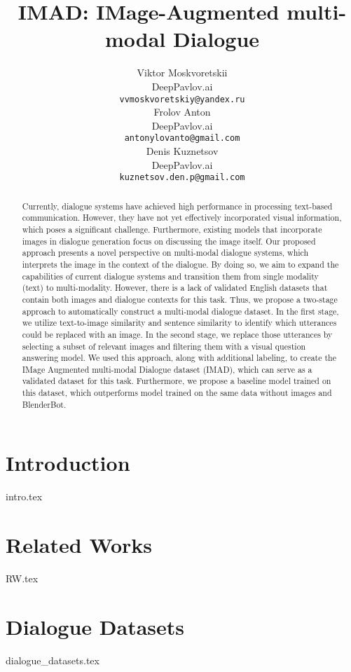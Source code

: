 \documentclass{article}
\title{IMAD: IMage-Augmented multi-modal Dialogue
}
\author{
  Viktor Moskvoretskii \\
  DeepPavlov.ai \\
  \texttt{vvmoskvoretskiy@yandex.ru} \\
   \And
   Frolov Anton \\
  DeepPavlov.ai \\
  \texttt{antonylovanto@gmail.com} \\
  \And
  Denis Kuznetsov \\
  DeepPavlov.ai \\
  \texttt{kuznetsov.den.p@gmail.com} \\
}
\begin{document}
\maketitle


\begin{abstract}
  Currently, dialogue systems have achieved high performance in processing text-based communication. However, they have not yet effectively incorporated visual information, which poses a significant challenge. Furthermore, existing models that incorporate images in dialogue generation focus on discussing the image itself. Our proposed approach presents a novel perspective on multi-modal dialogue systems, which interprets the image in the context of the dialogue. By doing so, we aim to expand the capabilities of current dialogue systems and transition them from single modality (text) to multi-modality. However, there is a lack of validated English datasets that contain both images and dialogue contexts for this task. Thus, we propose a two-stage approach to automatically construct a multi-modal dialogue dataset. In the first stage, we utilize text-to-image similarity and sentence similarity to identify which utterances could be replaced with an image. In the second stage, we replace those utterances by selecting a subset of relevant images and filtering them with a visual question answering model. We used this approach, along with additional labeling, to create the IMage Augmented multi-modal Dialogue dataset (IMAD), which can serve as a validated dataset for this task. Furthermore, we propose a baseline model trained on this dataset, which outperforms model trained on the same data without images and BlenderBot.
\end{abstract}




\section{Introduction}
{intro.tex}

\section{Related Works}
{RW.tex}

\section{Dialogue Datasets}
{dialogue_datasets.tex}
\end{document}
